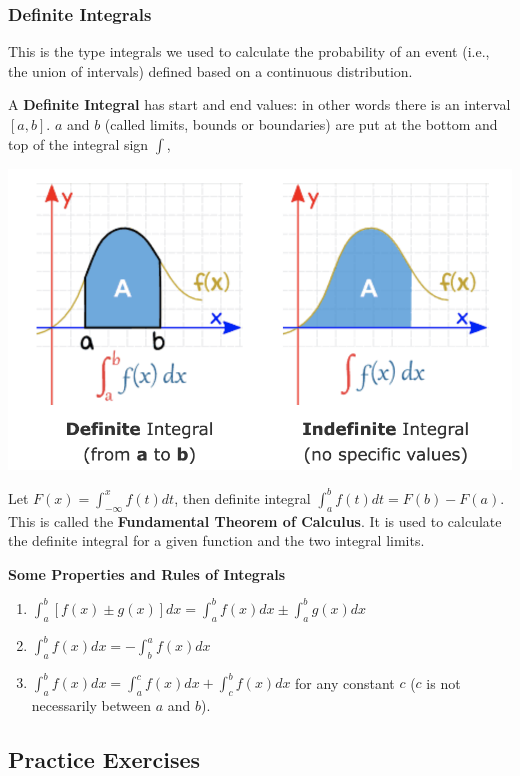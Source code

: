 \documentclass[
]{book}
\begin{document}
\hfill\break

\hypertarget{definite-integrals}{%
\subsubsection{Definite Integrals}\label{definite-integrals}}

This is the type integrals we used to calculate the probability of an event (i.e., the union of intervals) defined based on a continuous distribution.

A \textbf{Definite Integral} has start and end values: in other words there is an interval \([a, b]\). \(a\) and \(b\) (called limits, bounds or boundaries) are put at the bottom and top of the integral sign \(\int\),

\begin{center}\includegraphics[width=0.5\linewidth]{topic03/Definite-Indefite} \end{center}

Let \(F(x) = \int_{-\infty}^x f(t) dt\), then definite integral \(\int_a^b f(t)dt = F(b) - F(a)\). This is called the \textbf{Fundamental Theorem of Calculus}. It is used to calculate the definite integral for a given function and the two integral limits.

\hfill\break

\textbf{Some Properties and Rules of Integrals}

\begin{enumerate}
\def\labelenumi{\arabic{enumi}.}
\item
  \(\int_a^b [f(x) \pm g(x)]dx = \int_a^b f(x)dx \pm \int_a^b g(x)dx\)
\item
  \(\int_a^b f(x)dx = -\int_b^a f(x) dx\)
\item
  \(\int_a^b f(x)dx = \int_a^c f(x)dx + \int_c^b f(x)dx\) for any constant \(c\) (\(c\) is not necessarily between \(a\) and \(b\)).
\end{enumerate}

\hfill\break

\hypertarget{practice-exercises-2}{%
\subsection{Practice Exercises}\label{practice-exercises-2}}
\end{document}
